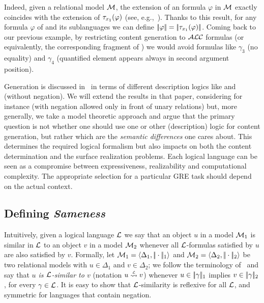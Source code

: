 Indeed, given a relational model $\mathcal{M}$, the extension of an \ALC formula $\varphi$ in $\mathcal{M}$ exactly coincides
with the extension of $\mathit{\tau}_{x_1}(\varphi)$ (see, e.g.,~\cite{baad:desc03}).  Thanks
to this result, for any formula $\varphi$ of \ALC and its sublanguages we can
define $|\!|\varphi|\!| = |\!|\mathit{\tau}_{x_1}(\varphi)|\!|$.  Coming back to our previous example,
 by restricting content generation to $\mathcal{ALC}$ formulas (or equivalently, the corresponding
 fragment of \FOL) we would avoid
formulas like $\gamma_3$ (no equality) and $\gamma_4$ (quantified
element appears always in second argument position).

Generation is discussed in~\cite{AKS08} in terms of different description
logics like \ALC and \EL (\ALC without negation). We will  extend the results
in that paper, considering for instance \ELAN (\ALC with negation allowed only
in front of unary relations) but, more generally, we take a model theoretic
approach and argue that the primary question is not whether one should use one
or other (description) logic for content generation, but rather which are the
\emph{semantic differences} one cares about. This determines the
required logical formalism but also impacts on both the
content determination and the surface realization problems.
Each logical language can be seen as a compromise between expressiveness,
realizability and computational complexity. The appropriate selection for a particular
GRE task should depend on the actual context.

\subsection{Defining \emph{Sameness}}

Intuitively,  given a logical language $\mathcal{L}$ we say that an object $u$ in a model
$\mathcal{M}_1$ is similar in $\mathcal{L}$ to
an object $v$ in a model $\mathcal{M}_2$ whenever all $\mathcal{L}$-formulas satisfied by $u$ are also
satisfied by $v$. Formally,
let $\mathcal{M}_1 = \langle \Delta_1, |\!|\cdot|\!|_1\rangle$ and $\mathcal{M}_2 = \langle \Delta_2, |\!|\cdot|\!|_2\rangle$ be
two relational models with $u \in \Delta_1$ and $v \in \Delta_2$;
we follow the terminology of~\cite{AKS08} and say that
\emph{$u$ is $\mathcal{L}$-similar to $v$}  (notation $u \simil{\+L} v$) whenever $u \in |\!|\gamma|\!|_1$ implies
$v \in |\!|\gamma|\!|_2$, for every $\gamma \in \mathcal{L}$. It is easy to show that
$\mathcal{L}$-similarity is reflexive for all $\mathcal{L}$, and symmetric  for languages that contain negation.

